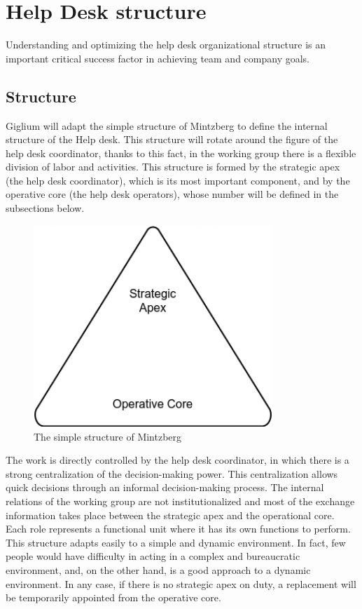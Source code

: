 \clearpage
\section{Help Desk structure}\label{structure}
Understanding and optimizing the help desk organizational structure is an important critical success factor in achieving team and company goals.

\subsection{Structure}
Giglium will adapt the simple structure of Mintzberg\cite{mintzberg_book} to define the internal structure of the Help desk. This structure will rotate around the figure of the help desk coordinator, thanks to this fact, in the working group there is a flexible division of labor and activities. This structure is formed by the strategic apex (the help desk coordinator), which is its most important component, and by the operative core (the help desk operators), whose number will be defined in the subsections below.

\begin{figure}[h!]
	\centering
	\includegraphics[width=90mm]{./img/structures/piramid.png}
	\caption{The simple structure of Mintzberg}\label{fig:piramid}
\end{figure}

The work is directly controlled by the help desk coordinator, in which there is a strong centralization of the decision-making power. This centralization allows quick decisions through an informal decision-making process. The internal relations of the working group are not institutionalized and most of the exchange information takes place between the strategic apex and the operational core. Each role represents a functional unit where it has its own functions to perform. This structure adapts easily to a simple and dynamic environment. In fact, few people would have difficulty in acting in a complex and bureaucratic environment, and, on the other hand, is a good approach to a dynamic environment. In any case, if there is no strategic apex on duty, a replacement will be temporarily appointed from the operative core.

